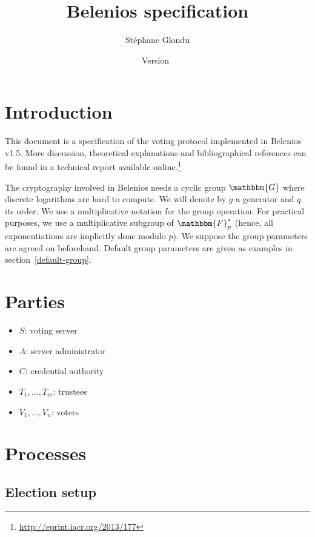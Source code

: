 \documentclass[a4paper]{article}
\title{Belenios specification}
\date{Version~\version}
\author{Stéphane Glondu}
\newcommand{\version}{1.5}
\newcommand{\F}{\mathbbm{F}}
\newcommand{\G}{\mathbbm{G}}
\begin{document}
\maketitle
\tableofcontents

\section{Introduction}

This document is a specification of the voting protocol implemented in
Belenios v\version. More discussion, theoretical explanations and
bibliographical references can be found in a technical report
available online.\footnote{\url{http://eprint.iacr.org/2013/177}}

The cryptography involved in Belenios needs a cyclic group $\G$ where
discrete logarithms are hard to compute. We will denote by $g$ a
generator and $q$ its order. We use a multiplicative notation for the
group operation. For practical purposes, we use a multiplicative
subgroup of $\F^*_p$ (hence, all exponentiations are implicitly done
modulo $p$). We suppose the group parameters are agreed on
beforehand. Default group parameters are given as examples in
section~\ref{default-group}.

\section{Parties}

\begin{itemize}
\item $S$: voting server
\item $A$: server administrator
\item $C$: credential authority
\item $T_1,\dots,T_m$: trustees
\item $V_1,\dots,V_n$: voters
\end{itemize}

\section{Processes}
\label{processes}

\subsection{Election setup}
\label{election-setup}
\end{document}
